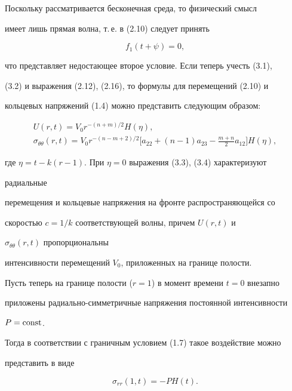 Поскольку рассматривается бесконечная среда, то физический смысл 


имеет лишь прямая волна, т.\,е. в (2.10) следует принять 


\begin{equation} 


f_1(t+\psi)=0, 


\end{equation} 


что представляет недостающее второе условие. Если теперь учесть (3.1), 


(3.2) и выражения (2.12), (2.16), то формулы для перемещений (2.10) и 


кольцевых напряжений (1.4) можно представить следующим образом: 


\begin{gather} 


U(r,t)=V_0r^{-(n+m)/2}H(\eta), \\ 


\sigma_{\theta\theta}(r,t)=V_0r^{-(n-m+2)/2} 


\biggl[a_{22}+(n-1)a_{23}-\frac{m+n}{2}a_{12}\biggr]H(\eta), 


\end{gather} 


где $\eta=t-k(r-1)$. При $\eta=0$ выражения (3.3), (3.4) характеризуют 


радиальные 


перемещения и кольцевые напряжения на фронте распространяющейся со 


скоростью $c=1/k$ соответствующей волны, причем $U(r,t)$ и 


$\sigma_{\theta\theta}(r,t)$ пропорциональны 


интенсивности перемещений $V_0$, приложенных на границе полости. 


 


Пусть теперь на границе полости ($r=1$) в момент времени $t=0$ внезапно 


приложены радиально-симметричные напряжения постоянной интенсивности 


$P=\operatorname{const}$. 


Тогда в соответствии с граничным условием (1.7) такое воздействие можно 


представить в виде 


\begin{equation} 


\sigma_{rr}(1,t)=-P H(t). 


\end{equation} 


